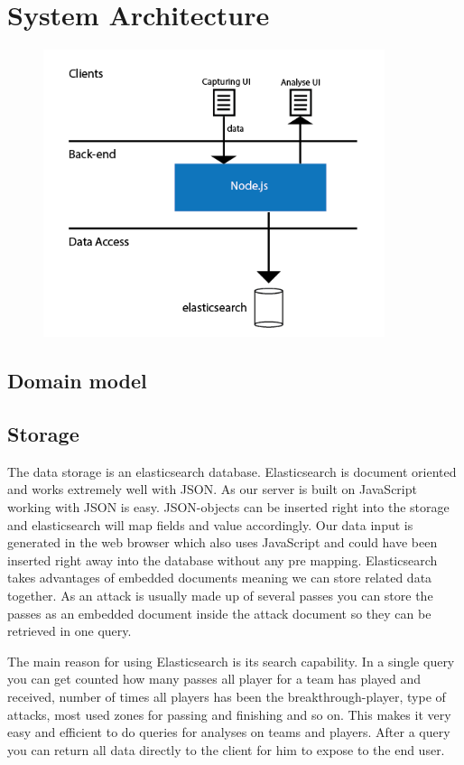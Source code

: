

\section{System Architecture}

\begin{figure}[ht!]
\centering
\includegraphics[width=100mm]{images/general/arhitecture.png}
\caption{}
\label{overflow}
\end{figure}

\subsection{Domain model}



\subsection{Storage}

The data storage is an elasticsearch database. Elasticsearch is document oriented and works extremely well with JSON. As our server is built on JavaScript working with JSON is easy. JSON-objects can be inserted right into the storage and elasticsearch will map fields and value accordingly.  Our data input is generated in the web browser which also uses JavaScript and could have been inserted right away into the database without any pre mapping.
Elasticsearch takes advantages of embedded documents meaning we can store related data together. As an attack is usually made up of several passes you can store the passes as an embedded document inside the attack document so they can be retrieved in one query. 

The main reason for using Elasticsearch is its search capability. In a single query you can get counted how many passes all player for a team has played and received, number of times all players has been the breakthrough-player, type of attacks, most used zones for passing and finishing and so on. This makes it very easy and efficient to do queries for analyses on teams and players. After a query you can return all data directly to the client for him to expose to the end user.

